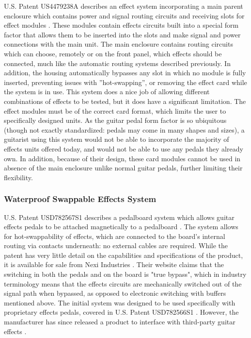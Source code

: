 \documentclass{article}
\begin{document}
		U.S. Patent US4479238A describes an effect system incorporating a main parent enclosure which contains power and signal routing circuits and receiving slots for effect modules \cite{SPECTOR:1982}. These modules contain effects circuits built into a special form factor that allows them to be inserted into the slots and make signal and power connections with the main unit. The main enclosure contains routing circuits which can choose, remotely or on the front panel, which effects should be connected, much like the automatic routing systems described previously. In addition, the housing automatically bypasses any slot in which no module is fully inserted, preventing issues with ”hot-swapping”, or removing the effect card while the system is in use. This system does a nice job of allowing different combinations of effects to be tested, but it does have a significant limitation. The effect modules must be of the correct card format, which limits the user to specifically designed units. As the guitar pedal form factor is so ubiquitous (though not exactly standardized: pedals may come in many shapes and sizes), a guitarist using this system would not be able to incorporate the majority of effects units offered today, and would not be able to use any pedals they already own. In addition, because of their design, these card modules cannot be used in absence of the main enclosure unlike normal guitar pedals, further limiting their flexibility.

		\subsubsection{Waterproof Swappable Effects System}

		U.S. Patent USD782567S1 describes a pedalboard system which allows guitar effects pedals to be attached magnetically to a pedalboard \cite{FAORO:2015board}.  The system allows for hot-swappability of effects, which are connected to the board's internal routing via contacts underneath: no external cables are required.  While the patent has very little detail on the capabilities and specifications of the product, it is available for sale from Nexi Industries \cite{NexiIndustries}.  Their website claims that the switching in both the pedals and on the board is "true bypass", which in industry terminology means that the effects circuits are mechanically switched out of the signal path when bypassed, as opposed to electronic switching with buffers mentioned above.  The initial system was designed to be used specifically with proprietary effects pedals, covered in U.S. Patent USD782566S1 \cite{FAORO:2015pedal}.  However, the manufacturer has since released a product to interface with third-party guitar effects \cite{conNEXI}.
\end{document}
